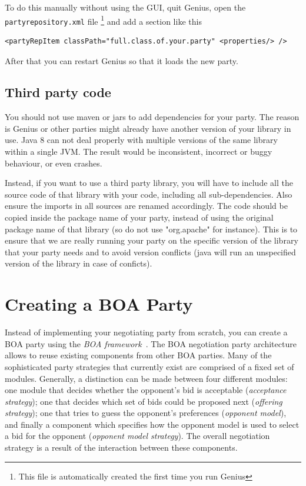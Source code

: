 \documentclass[]{article}
\newcommand\Genius{{\sc Genius}}
\begin{document}
To do this manually without using the GUI, quit {\Genius}, open the \verb|partyrepository.xml| file \footnote{This file is automatically created the first time you run {\Genius}}  and add a section like this

\begin{lstlisting}
<partyRepItem classPath="full.class.of.your.party" <properties/> />
\end{lstlisting}

After that you can restart {\Genius} so that it loads the new party.
\FloatBarrier

\subsection{Third party code}
You should not use maven or jars to add dependencies for your party. The reason is {\Genius} or other parties might already have another version of your library in use. Java 8 can not deal properly with multiple versions of the same library within a single JVM. The result would be inconsistent, incorrect or buggy behaviour, or even crashes.

Instead, if you want to use a third party library, you will have to include all the source code of that library with your code, including all sub-dependencies. Also ensure the imports in all sources are renamed accordingly. The code should be copied inside the package name of your party, instead of using the original package name of that library (so do not use "org.apache" for instance). This is to ensure that we are really running your party on the specific version of the library that your party needs and to avoid version conflicts (java will run an unspecified version of the library in case of conficts). 


\section{Creating a BOA Party}\label{sec:boa}
Instead of implementing your negotiating party from scratch, you can create a BOA party using the \textit{BOA framework}~\cite{BaarslagBOA}.
The BOA negotiation party architecture allows to reuse existing components from other BOA parties. Many of the sophisticated party strategies that currently exist are comprised of a fixed set of modules. Generally, a distinction can be made between four different modules: one module that decides whether the opponent's bid is acceptable (\textit{acceptance strategy}); one that decides which set of bids could be proposed next (\textit{offering strategy}); one that tries to guess the opponent's preferences (\textit{opponent model}), and finally a component which specifies how the opponent model is used to select a bid for the opponent (\textit{opponent model strategy}). The overall negotiation strategy is a result of the interaction between these components.
\end{document}
